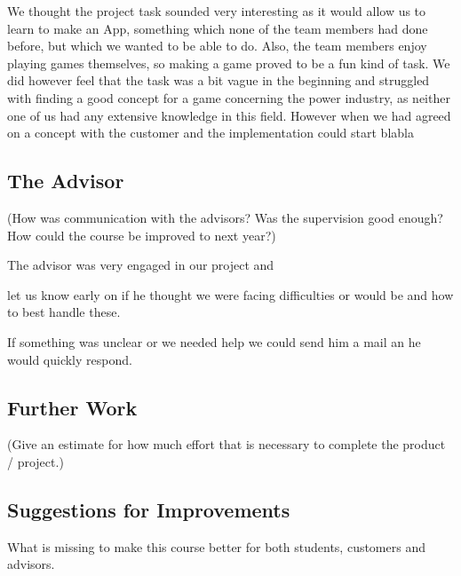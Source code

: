	We thought the project task sounded very interesting as it would allow us to learn to make an App, something which none of the team members had done before, but which we wanted to be able to do. Also, the team members enjoy playing games themselves, so making a game proved to be a fun kind of task. We did however feel that the task was a bit vague in the beginning and struggled with finding a good concept for a game concerning the power industry, as neither one of us had any extensive knowledge in this field. However when we had agreed on a concept with the customer and the implementation could start blabla


\subsection{The Advisor}

	(How was communication with the advisors? Was the supervision good enough? 
	How could the course be improved to next year?)

	The advisor was very engaged in our project and 

	let us know early on if he thought we were facing difficulties or would be and how to best handle these.

	If something was unclear or we needed help we could send him a mail an he would quickly respond.


\subsection{Further Work}

	(Give an estimate for how much effort that is necessary to complete the product / 
	project.)

\subsection{Suggestions for Improvements}

What is missing to make this course better for both students, 
customers and advisors. 







